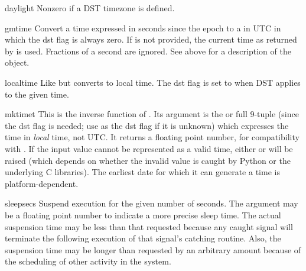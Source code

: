 \begin{datadesc}{daylight}
Nonzero if a DST timezone is defined.
\end{datadesc}

\begin{funcdesc}{gmtime}{}
Convert a time expressed in seconds since the epoch to a 
in UTC in which the dst flag is always zero.  If  is not
provided, the current time as returned by  is used.
Fractions of a second are ignored.  See above for a description of the
 object.
\end{funcdesc}

\begin{funcdesc}{localtime}{}
Like  but converts to local time.  The dst flag is
set to  when DST applies to the given time.
\end{funcdesc}

\begin{funcdesc}{mktime}{t}
This is the inverse function of .  Its argument
is the  or full 9-tuple (since the dst flag is
needed; use  as the dst flag if it is unknown) which
expresses the time in
\emph{local} time, not UTC.  It returns a floating point number, for
compatibility with .  If the input value cannot be
represented as a valid time, either  or
 will be raised (which depends on whether the
invalid value is caught by Python or the underlying C libraries).  The
earliest date for which it can generate a time is platform-dependent.
\end{funcdesc}

\begin{funcdesc}{sleep}{secs}
Suspend execution for the given number of seconds.  The argument may
be a floating point number to indicate a more precise sleep time.
The actual suspension time may be less than that requested because any
caught signal will terminate the  following
execution of that signal's catching routine.  Also, the suspension
time may be longer than requested by an arbitrary amount because of
the scheduling of other activity in the system.
\end{funcdesc}

